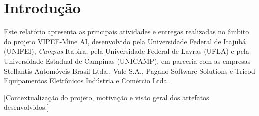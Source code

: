 \chapter{Introdução}

Este relatório apresenta as principais atividades e entregas realizadas no âmbito do projeto VIPEE-Mine AI, desenvolvido pela Universidade Federal de Itajubá (UNIFEI), \textit{Campus} Itabira, pela Universidade Federal de Lavras (UFLA) e pela Universidade Estadual de Campinas (UNICAMP), em parceria com as empresas Stellantis Automóveis Brasil Ltda., Vale S.A., Pagano Software Solutions e Tricod Equipamentos Eletrônicos Indústria e Comércio Ltda.

[Contextualização do projeto, motivação e visão geral dos artefatos desenvolvidos.]
